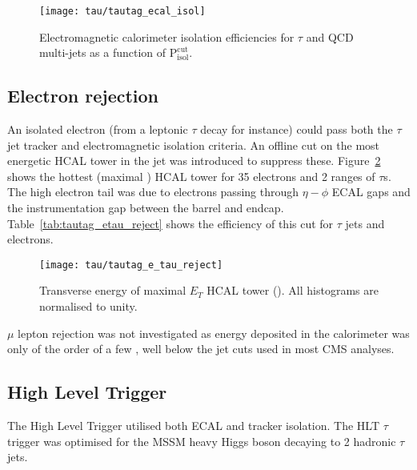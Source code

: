 \begin{figure}[tb]
  \centering
  \texttt{[image: tau/tautag\_ecal\_isol]}
  \caption{Electromagnetic calorimeter isolation efficiencies for $\tau$ and QCD multi-jets as a function of $\mathrm{P_{isol}^{cut}}$.~\cite{CMS_TDR_PHYS_vol1, citeulike:800614}
  \label{fig:tautag_ecal_isol}}
\end{figure}

\subsection{Electron rejection \label{sec:e_rejection}}
An isolated electron (from a leptonic $\tau$ decay for instance) could pass both the $\tau$ jet tracker and electromagnetic isolation criteria. An offline cut on the most energetic HCAL tower in the jet was introduced to suppress these. Figure~\ref{fig:tau_e_reject} shows the hottest (maximal \ET) HCAL tower for 35 \GeV electrons and 2 \PT ranges of $\tau$s. The high electron \ET tail was due to electrons passing through $\eta-\phi$ ECAL gaps and the instrumentation gap between the barrel and endcap. Table~\ref{tab:tautag_etau_reject} shows the efficiency of this cut for $\tau$ jets and electrons. 

\begin{figure}[tb]
  \centering
  \texttt{[image: tau/tautag\_e\_tau\_reject]}
  \caption{Transverse energy of maximal $E_{T}$ HCAL tower (\GeV). All histograms are normalised to unity.~\cite{CMS_TDR_PHYS_vol1, citeulike:800614}
  \label{fig:tau_e_reject}}
\end{figure}

$\mu$ lepton rejection was not investigated as energy deposited in the calorimeter was only of the order of a few \GeV, well below the jet \ET cuts used in most CMS analyses.

\subsection{High Level Trigger\label{sec:CaloPxl}}
The High Level Trigger utilised both ECAL and tracker isolation. The HLT $\tau$ trigger was optimised for the MSSM heavy Higgs boson decaying to 2 hadronic $\tau$ jets.

